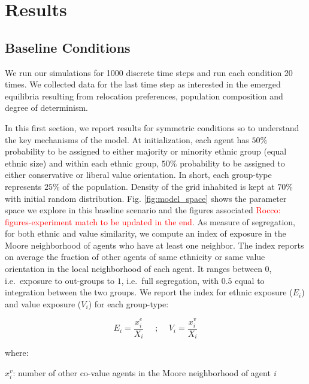 \documentclass[
]{article}
\begin{document}
\hypertarget{results}{%
\section{Results}\label{results}}

\hypertarget{baseline-conditions}{%
\subsection{Baseline Conditions}\label{baseline-conditions}}

We run our simulations for 1000 discrete time steps and run each
condition 20 times. We collected data for the last time step as
interested in the emerged equilibria resulting from relocation
preferences, population composition and degree of determinism.

In this first section, we report results for symmetric conditions so to
understand the key mechanisms of the model. At initialization, each
agent has \(50\%\) probability to be assigned to either majority or
minority ethnic group (equal ethnic size) and within each ethnic group,
\(50\%\) probability to be assigned to either conservative or liberal
value orientation. In short, each group-type represents \(25\%\) of the
population. Density of the grid inhabited is kept at \(70\%\) with
initial random distribution. Fig. \ref{fig:model_space} shows the
parameter space we explore in this baseline scenario and the figures
associated
{\textcolor{red}{Rocco: figures-experiment match to be updated in the end}}.
As measure of segregation, for both ethnic and value similarity, we
compute an index of exposure in the Moore neighborhood of agents who
have at least one neighbor. The index reports on average the fraction of
other agents of same ethnicity or same value orientation in the local
neighborhood of each agent. It ranges between \(0\), i.e.~exposure to
out-groups to \(1\), i.e.~full segregation, with \(0.5\) equal to
integration between the two groups. We report the index for ethnic
exposure (\(E_i\)) and value exposure (\(V_i\)) for each group-type:

\begin{equation}
   E_i = \frac{x^e_i}{X_i}\quad\text{   ;    }\quad  V_i = \frac{x^v_i}{X_i}
\end{equation}

where: \par
\(x^v_i\): number of other co-value agents in the
Moore neighborhood of agent \textit{i}

\par
\end{document}
